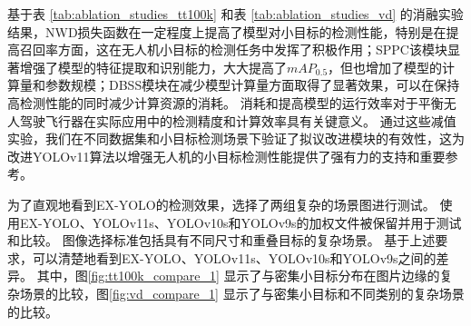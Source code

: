 基于表 \ref{tab:ablation_studies_tt100k} 和表 \ref{tab:ablation_studies_vd} 的消融实验结果，NWD损失函数在一定程度上提高了模型对小目标的检测性能，特别是在提高召回率方面，这在无人机小目标的检测任务中发挥了积极作用；SPPC该模块显著增强了模型的特征提取和识别能力，大大提高了$mAP_{0.5}$，但也增加了模型的计算量和参数规模；DBSS模块在减少模型计算量方面取得了显著效果，可以在保持高检测性能的同时减少计算资源的消耗。 消耗和提高模型的运行效率对于平衡无人驾驶飞行器在实际应用中的检测精度和计算效率具有关键意义。 通过这些减值实验，我们在不同数据集和小目标检测场景下验证了拟议改进模块的有效性，这为改进YOLOv11算法以增强无人机的小目标检测性能提供了强有力的支持和重要参考。

为了直观地看到EX-YOLO的检测效果，选择了两组复杂的场景图进行测试。 使用EX-YOLO、YOLOv11s、YOLOv10s和YOLOv9s的加权文件被保留并用于测试和比较。 图像选择标准包括具有不同尺寸和重叠目标的复杂场景。 基于上述要求，可以清楚地看到EX-YOLO、YOLOv11s、YOLOv10s和YOLOv9s之间的差异。 其中，图\ref{fig:tt100k_compare_1}
显示了与密集小目标分布在图片边缘的复杂场景的比较，图\ref{fig:vd_compare_1}
显示了与密集小目标和不同类别的复杂场景的比较。

